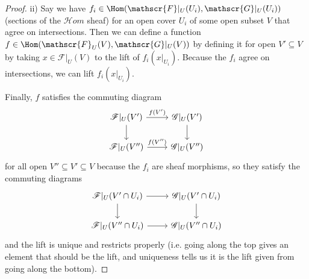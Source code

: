 \begin{proof}
	ii) Say we have $f_i \in \Hom(\mathscr{F}|_{U}(U_i), \mathscr{G}|_U(U_i)) $ (sections of the $\mathscr{H}om $ sheaf) for an open cover $U_i $ of some open subset $V $ that agree on intersections.
	Then we can define a function $f \in \Hom(\mathscr{F}_U(V), \mathscr{G}|_U(V)) $ by defining it for open $V' \subseteq V $ by taking $x \in \mathscr{F}|_U(V) $ to the lift of $f_i(x|_{U_i}) $.
	Because the $f_i $ agree on intersections, we can lift $f_i(x|_{U_i}) $.

	Finally, $f $ satisfies the commuting diagram
	\[
	\begin{tikzcd}
	\mathscr{F}|_U(V') & \mathscr{G}|_U(V')\\
	\mathscr{F}|_U(V'') & \mathscr{G}|_U(V'')
	\arrow["f(V')",from=1-1,to=1-2]
	\arrow[from=1-1,to=2-1]
	\arrow["f(V'')",from=2-1,to=2-2]
	\arrow[from=1-2,to=2-2]
	\end{tikzcd}
	\]
	for all open $V'' \subseteq V' \subseteq V$ because the $f_i $ are sheaf morphisms, so they satisfy the commuting diagrams
	\[
	\begin{tikzcd}
	\mathscr{F}|_U(V'\cap U_i) & \mathscr{G}|_U(V'\cap U_i)\\
	\mathscr{F}|_U(V''\cap U_i) & \mathscr{G}|_U(V''\cap U_i)
	\arrow[from=1-1,to=1-2]
	\arrow[from=1-1,to=2-1]
	\arrow[from=2-1,to=2-2]
	\arrow[from=1-2,to=2-2]
	\end{tikzcd}
	\]
	and the lift is unique and restricts properly (i.e. going along the top gives an element that should be the lift, and uniqueness tells us it is the lift given from going along the bottom).
\end{proof}

